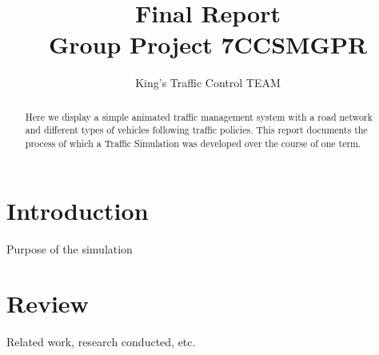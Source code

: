 \documentclass{article}[11pt,Tahoma]
\begin{document}
	\title{Final Report\\ Group Project 7CCSMGPR} 	
    \author{King's Traffic Control TEAM}
	\maketitle
	\begin{abstract}
		Here we display a simple animated traffic management system with a road network and different types of vehicles following traffic policies. This report documents the process of which a Traffic Simulation was developed over the course of one term.
	\end{abstract}
	\clearpage
	\tableofcontents
	\section{Introduction}
		Purpose of the simulation
	\section{Review}
		Related work, research conducted, etc.
\end{document}
